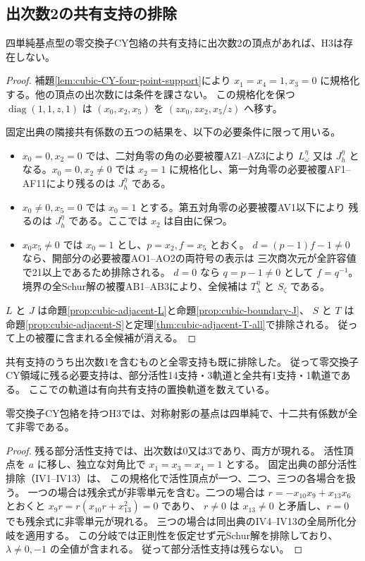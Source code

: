 \subsection{出次数2の共有支持の排除}
\begin{theorem}\label{thm:cubic-CY-four-point-degree-two-empty}
四単純基点型の零交換子CY包絡の共有支持に出次数2の頂点があれば、H3は存在しない。
\end{theorem}
\begin{proof}
補題\ref{lem:cubic-CY-four-point-support}により
$x_1=x_4=1,x_3=0$ に規格化する。他の頂点の出次数には条件を課さない。
この規格化を保つ $\operatorname{diag}(1,1,z,1)$ は
$(x_0,x_2,x_5)$ を $(zx_0,zx_2,x_5/z)$ へ移す。

固定出典\cite{AS4CYpinned}の隣接共有係数の五つの結果を、以下の必要条件に限って用いる。
\begin{itemize}
\item $x_0=0,x_2=0$ では、二対角零の角の必要被覆AZ1--AZ3により
$L^\eta_\omega$ 又は $J^\eta_h$ となる。$x_0=0,x_2\ne0$ では
$x_2=1$ に規格化し、第一対角零の必要被覆AF1--AF11により残るのは $J^\eta_h$ である。
\item $x_0\ne0,x_5=0$ では $x_0=1$ とする。第五対角零の必要被覆AV1以下により
残るのは $J^\eta_h$ である。ここでは $x_2$ は自由に保つ。
\item $x_0x_5\ne0$ では $x_0=1$ とし、$p=x_2,f=x_5$ とおく。
$d=(p-1)f-1\ne0$ なら、開部分の必要被覆AO1--AO2の両符号の表示は
三次商次元が全許容値で21以上であるため排除される。
$d=0$ なら $q=p-1\ne0$ として $f=q^{-1}$。
境界の全Schur解の被覆AB1--AB3により、全候補は $T^\eta_\lambda$ と $S_\zeta$ である。
\end{itemize}
$L$ と $J$ は命題\ref{prop:cubic-adjacent-L}と命題\ref{prop:cubic-boundary-J}、
$S$ と $T$ は命題\ref{prop:cubic-adjacent-S}と定理\ref{thm:cubic-adjacent-T-all}で排除される。
従って上の被覆に含まれる全候補が消える。
\end{proof}

共有支持のうち出次数1を含むものと全零支持も既に排除した。
従って零交換子CY領域に残る必要支持は、部分活性14支持・3軌道と全共有1支持・1軌道である。
ここでの軌道は有向共有支持の置換軌道を数えている。

\begin{corollary}\label{cor:cubic-CY-four-point-full-shared-necessary}
零交換子CY包絡を持つH3では、対称射影の基点は四単純で、十二共有係数が全て非零である。
\end{corollary}
\begin{proof}
残る部分活性支持では、出次数は0又は3であり、両方が現れる。
活性頂点を $a$ に移し、独立な対角比で $x_1=x_3=x_4=1$ とする。
固定出典\cite{AS4CYpinned}の部分活性排除（IV1--IV13）は、
この規格化で活性頂点が一つ、二つ、三つの各場合を扱う。
一つの場合は残余式が非零単元を含む。二つの場合は
$r=-x_{10}x_9+x_{13}x_6$ とおくと $x_9r=r(x_{10}r+x_{13}^2)=0$ であり、
$r\ne0$ は $x_{13}\ne0$ と矛盾し、$r=0$ でも残余式に非零単元が現れる。
三つの場合は同出典のIV4--IV13の全局所化分岐を適用する。
この分岐では正則性を仮定せず元Schur解を排除しており、$\lambda\ne0,-1$ の全値が含まれる。
従って部分活性支持は残らない。
\end{proof}


